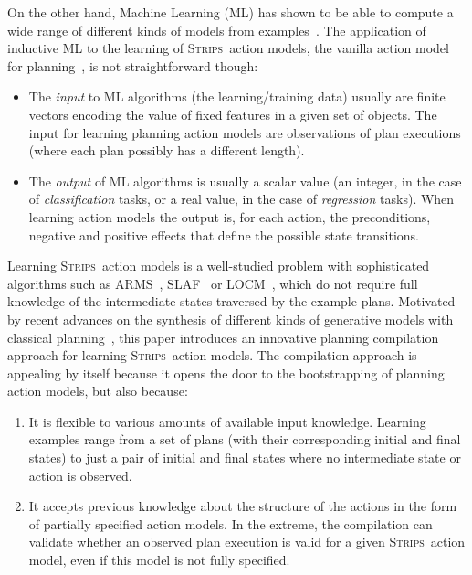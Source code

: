 \documentclass[letterpaper]{article} %
\newcommand{\strips}{\textsc{Strips}}     %
\begin{document}
On the other hand, Machine Learning (ML) has shown to be able to compute a wide range of different kinds of models from examples~\cite{michalski2013machine}. The application of inductive ML to the learning of \strips\ action models, the vanilla action model for planning~\cite{fikes1971strips}, is not straightforward though:
\begin{itemize}
\item The {\em input} to ML algorithms (the learning/training data) usually are finite vectors encoding the value of fixed features in a given set of objects. The input for learning planning action models are observations of plan executions (where each plan possibly has a different length).
\item The {\em output} of ML algorithms is usually a scalar value (an integer, in the case of {\em classification} tasks, or a real value, in the case of {\em regression} tasks). When learning action models the output is, for each action, the preconditions, negative and positive effects that define the possible state transitions.
\end{itemize}

Learning \strips\ action models is a well-studied problem with sophisticated algorithms such as {\sc ARMS}~\cite{yang2007learning}, {\sc SLAF}~\cite{amir:alearning:JAIR08} or {\sc LOCM}~\cite{cresswell2013acquiring}, which do not require full knowledge of the intermediate states traversed by the example plans. Motivated by recent advances on the synthesis of different kinds of generative models with classical planning~\cite{bonet2009automatic,segovia2016hierarchical,segovia2017generating}, this paper introduces an innovative planning compilation approach for learning \strips\ action models. The compilation approach is appealing by itself because it opens the door to the bootstrapping of planning action models, but also because:

\begin{enumerate}
\item It is flexible to various amounts of available input knowledge. Learning examples range from a set of plans (with their corresponding initial and final states) to just a pair of initial and final states where no intermediate state or action is observed.
\item It accepts previous knowledge about the structure of the actions in the form of partially specified action models. In the extreme, the compilation can validate whether an observed plan execution is valid for a given \strips\ action model, even if this model is not fully specified.
\end{enumerate}
\end{document}
